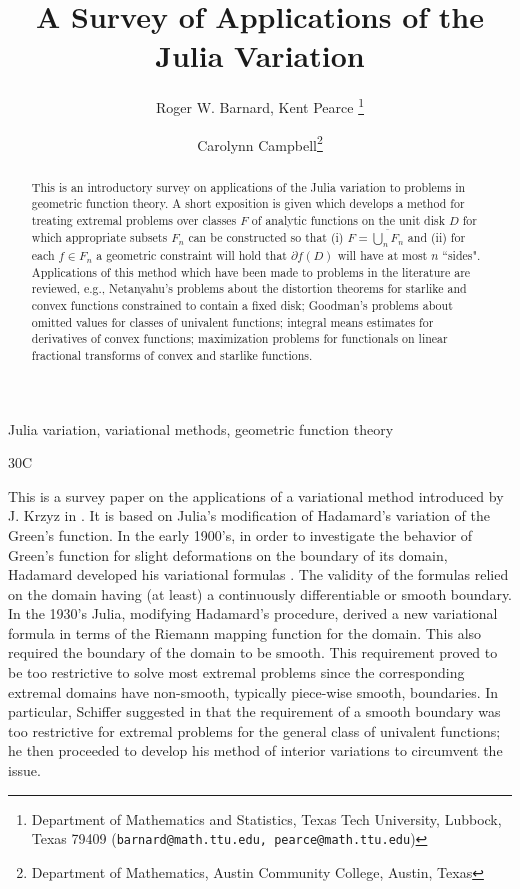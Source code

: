 \documentclass[final]{siamltex}
\title{A Survey of Applications of the Julia Variation}
\author{Roger W. Barnard, Kent Pearce \thanks{Department of 
Mathematics and Statistics,  Texas Tech University, 
Lubbock, Texas  79409 
({\tt barnard@math.ttu.edu, pearce@math.ttu.edu}) }
\and Carolynn Campbell\thanks {Department of 
Mathematics, Austin Community College, 
Austin, Texas  }}
\begin{document}
\maketitle
\begin{abstract}

 \noindent This is an introductory survey on applications of the Julia variation to problems in geometric 
function theory. A short exposition is given which develops a method for treating extremal problems
over classes $F$ of analytic functions on the unit disk $D$ for which appropriate subsets $F_n$ can be 
constructed so that (i) $F = \overline{\bigcup_n F_n}$ and 
(ii) for each $f \in F_n$ a geometric constraint will hold that $\partial f(D)$ will have at most $n$ ``sides".
Applications of this method which have been made to problems in the literature are reviewed, e.g., Netanyahu's 
problems about the distortion theorems for starlike and convex functions constrained to contain a fixed disk; 
Goodman's problems about omitted values for classes of univalent functions; integral means estimates 
for derivatives of convex functions; maximization problems for functionals on linear fractional transforms 
of convex and starlike functions.
\end{abstract}


\begin{keywords} 
Julia variation, variational methods, geometric function theory 
\end{keywords}

\begin{AMS}
30C
\end{AMS}

\pagestyle{myheadings}
\thispagestyle{plain}




This is a survey paper on the applications of a variational method introduced by J. Krzyz in \cite{Krzyz1}.
It is based on Julia's modification of Hadamard's variation of the Green's function.  In the early
1900's, in order to investigate the behavior of Green's function for slight deformations on the boundary 
of its domain, Hadamard developed his variational formulas \cite{Haramard1}.  The validity of the formulas 
relied on the domain having (at least) a continuously differentiable or smooth boundary.  In the 1930's 
Julia, modifying Hadamard's procedure, derived a new variational formula in terms of the Riemann mapping
function for the domain.  This also required the boundary of the domain to be smooth.  This requirement 
proved to be too restrictive to solve most extremal problems since the corresponding extremal domains 
have non-smooth, typically piece-wise smooth, boundaries.  In particular, Schiffer suggested in \cite{Schiffer1} that the requirement of
a smooth boundary was too restrictive for extremal problems for the general class of univalent functions; he 
then proceeded to develop his method of interior variations to circumvent the issue.
\end{document}
